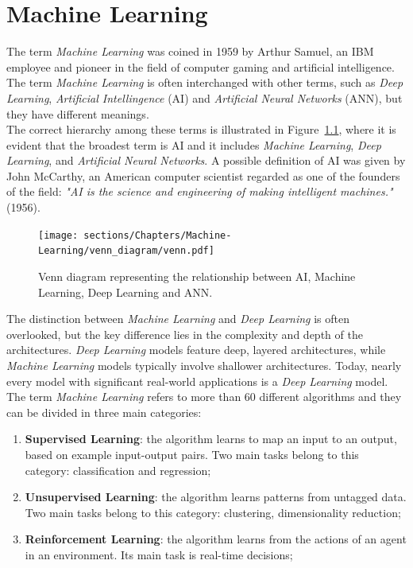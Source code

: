 
\chapter{Machine Learning}

The term \textit{Machine Learning} was coined in 1959 by Arthur Samuel, an IBM employee and pioneer in the field of computer gaming and 
artificial intelligence.
The term \textit{Machine Learning} is often interchanged with other terms, such as \textit{Deep Learning}, \textit{Artificial Intellingence} (AI) 
and \textit{Artificial Neural Networks} (ANN), but they have different meanings.\\
The correct hierarchy among these terms is illustrated in Figure~\ref{fig:venn-AI}, where it is evident that the broadest term is AI and it includes 
\textit{Machine Learning}, \textit{Deep Learning}, and \textit{Artificial Neural Networks}.
A possible definition of AI was given by John McCarthy, an American computer scientist regarded as one of the founders of the field: 
\textit{"AI is the science and engineering of making intelligent machines."} (1956).

\begin{figure}[h]
\centering
\texttt{[image: sections/Chapters/Machine-Learning/venn\_diagram/venn.pdf]}
\caption{Venn diagram representing the relationship between AI, Machine Learning, Deep Learning and ANN.}
\label{fig:venn-AI}
\end{figure}

The distinction between \textit{Machine Learning} and \textit{Deep Learning} is often overlooked, but the key difference lies 
in the complexity and depth of the architectures. \textit{Deep Learning} models feature deep, layered architectures, while \textit{Machine Learning}
models typically involve shallower architectures. Today, nearly every model with significant real-world applications is a \textit{Deep Learning} model.\\

The term \textit{Machine Learning} refers to more than 60 different algorithms and they can be divided in three main categories: 

\begin{enumerate}

\item \textbf{Supervised Learning}: the algorithm learns to map an input to an output,  based on example input-output pairs.
Two main tasks belong to this category: classification and regression;
\item \textbf{Unsupervised Learning}: the algorithm learns patterns from untagged data.
Two main tasks belong to this category: clustering, dimensionality reduction;
\item \textbf{Reinforcement Learning}: the algorithm learns from the actions of an agent in an environment.
Its main task is real-time decisions;

\end{enumerate}

